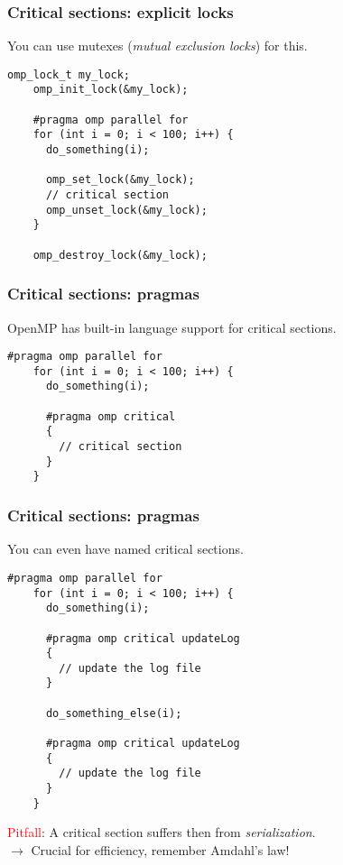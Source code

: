 \begin{frame}[fragile]
  \frametitle{Critical sections: explicit locks}
  You can use mutexes (\emph{mutual exclusion locks}) for this.
  \begin{lstlisting}[style=c]
    omp_lock_t my_lock;
    omp_init_lock(&my_lock);

    #pragma omp parallel for
    for (int i = 0; i < 100; i++) {
      do_something(i);

      omp_set_lock(&my_lock);
      // critical section
      omp_unset_lock(&my_lock);
    }

    omp_destroy_lock(&my_lock);
  \end{lstlisting}
\end{frame}

\begin{frame}[fragile]
  \frametitle{Critical sections: pragmas}
  OpenMP has built-in language support for critical sections.
  \begin{lstlisting}[style=c]
    #pragma omp parallel for
    for (int i = 0; i < 100; i++) {
      do_something(i);

      #pragma omp critical
      {
        // critical section
      }
    }
  \end{lstlisting}
\end{frame}

\begin{frame}[fragile]
  \frametitle{Critical sections: pragmas}
  You can even have named critical sections.
  \begin{lstlisting}[style=c, basicstyle=\ttfamily\footnotesize]
    #pragma omp parallel for
    for (int i = 0; i < 100; i++) {
      do_something(i);

      #pragma omp critical updateLog
      {
        // update the log file
      }

      do_something_else(i);

      #pragma omp critical updateLog
      {
        // update the log file
      }
    }
  \end{lstlisting}

\textcolor{red}{Pitfall}: A critical section suffers then from \textit{serialization}.\\
$\rightarrow$ Crucial for efficiency, remember Amdahl's law!
\end{frame}


